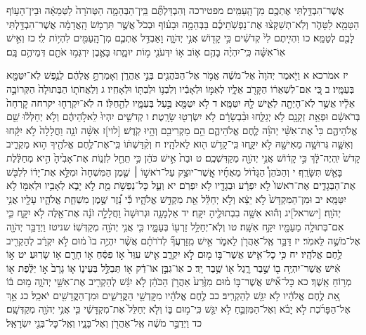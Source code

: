 \documentclass[twoside, openany, parskip=half, 11pt]{book}
\begin{document}
אֲשֶׁר־הִבְדַּ֥לְתִּי אֶתְכֶ֖ם מִן־הָֽעַמִּֽים׃ מפטירכה וְהִבְדַּלְתֶּ֞ם בֵּֽין־הַבְּהֵמָ֤ה הַטְּהֹרָה֙ לַטְּמֵאָ֔ה וּבֵין־הָע֥וֹף הַטָּמֵ֖א לַטָּהֹ֑ר וְלֹֽא־תְשַׁקְּצ֨וּ אֶת־נַפְשֹֽׁתֵיכֶ֜ם בַּבְּהֵמָ֣ה וּבָע֗וֹף וּבְכֹל֙ אֲשֶׁ֣ר תִּרְמֹ֣שׂ הָֽאֲדָמָ֔ה אֲשֶׁר־הִבְדַּ֥לְתִּי לָכֶ֖ם לְטַמֵּֽא׃ כו וִהְיִ֤יתֶם לִי֙ קְדֹשִׁ֔ים כִּ֥י קָד֖וֹשׁ אֲנִ֣י יְהֹוָ֑ה וָאַבְדִּ֥ל אֶתְכֶ֛ם מִן־הָֽעַמִּ֖ים לִהְי֥וֹת לִֽי׃ כז וְאִ֣ישׁ אֽוֹ־אִשָּׁ֗ה כִּֽי־יִהְיֶ֨ה בָהֶ֥ם א֛וֹב א֥וֹ יִדְּעֹנִ֖י מ֣וֹת יוּמָ֑תוּ בָּאֶ֛בֶן יִרְגְּמ֥וּ אֹתָ֖ם דְּמֵיהֶ֥ם בָּֽם׃

יז אמֹרכא א וַיֹּ֤אמֶר יְהֹוָה֙ אֶל־מֹשֶׁ֔ה אֱמֹ֥ר אֶל־הַכֹּהֲנִ֖ים בְּנֵ֣י אַהֲרֹ֑ן וְאָמַרְתָּ֣ אֲלֵהֶ֔ם לְנֶ֥פֶשׁ לֹֽא־יִטַּמָּ֖א בְּעַמָּֽיו׃ ב כִּ֚י אִם־לִשְׁאֵר֔וֹ הַקָּרֹ֖ב אֵלָ֑יו לְאִמּ֣וֹ וּלְאָבִ֔יו וְלִבְנ֥וֹ וּלְבִתּ֖וֹ וּלְאָחִֽיו׃ ג וְלַאֲחֹת֤וֹ הַבְּתוּלָה֙ הַקְּרוֹבָ֣ה אֵלָ֔יו אֲשֶׁ֥ר לֹֽא־הָיְתָ֖ה לְאִ֑ישׁ לָ֖הּ יִטַּמָּֽא׃ ד לֹ֥א יִטַּמָּ֖א בַּ֣עַל בְּעַמָּ֑יו לְהֵ֖חַלּֽוֹ׃ ה לֹֽא־יִקְרְח֤וּ יקרחה קׇרְחָה֙ בְּרֹאשָׁ֔ם וּפְאַ֥ת זְקָנָ֖ם לֹ֣א יְגַלֵּ֑חוּ וּבִ֨בְשָׂרָ֔ם לֹ֥א יִשְׂרְט֖וּ שָׂרָֽטֶת׃ ו קְדֹשִׁ֤ים יִהְיוּ֙ לֵאלֹ֣הֵיהֶ֔ם וְלֹ֣א יְחַלְּל֔וּ שֵׁ֖ם אֱלֹהֵיהֶ֑ם כִּי֩ אֶת־אִשֵּׁ֨י יְהֹוָ֜ה לֶ֧חֶם אֱלֹהֵיהֶ֛ם הֵ֥ם מַקְרִיבִ֖ם וְהָ֥יוּ קֹֽדֶשׁ׃ [לוי]ז אִשָּׁ֨ה זֹנָ֤ה וַחֲלָלָה֙ לֹ֣א יִקָּ֔חוּ וְאִשָּׁ֛ה גְּרוּשָׁ֥ה מֵאִישָׁ֖הּ לֹ֣א יִקָּ֑חוּ כִּֽי־קָדֹ֥שׁ ה֖וּא לֵאלֹהָֽיו׃ ח וְקִ֨דַּשְׁתּ֔וֹ כִּֽי־אֶת־לֶ֥חֶם אֱלֹהֶ֖יךָ ה֣וּא מַקְרִ֑יב קָדֹשׁ֙ יִֽהְיֶה־לָּ֔ךְ כִּ֣י קָד֔וֹשׁ אֲנִ֥י יְהֹוָ֖ה מְקַדִּשְׁכֶֽם׃ ט וּבַת֙ אִ֣ישׁ כֹּהֵ֔ן כִּ֥י תֵחֵ֖ל לִזְנ֑וֹת אֶת־אָבִ֙יהָ֙ הִ֣יא מְחַלֶּ֔לֶת בָּאֵ֖שׁ תִּשָּׂרֵֽף׃
י וְהַכֹּהֵן֩ הַגָּד֨וֹל מֵאֶחָ֜יו אֲֽשֶׁר־יוּצַ֥ק עַל־רֹאשׁ֣וֹ ׀ שֶׁ֤מֶן הַמִּשְׁחָה֙ וּמִלֵּ֣א אֶת־יָד֔וֹ לִלְבֹּ֖שׁ אֶת־הַבְּגָדִ֑ים אֶת־רֹאשׁוֹ֙ לֹ֣א יִפְרָ֔ע וּבְגָדָ֖יו לֹ֥א יִפְרֹֽם׃ יא וְעַ֛ל כׇּל־נַפְשֹׁ֥ת מֵ֖ת לֹ֣א יָבֹ֑א לְאָבִ֥יו וּלְאִמּ֖וֹ לֹ֥א יִטַּמָּֽא׃ יב וּמִן־הַמִּקְדָּשׁ֙ לֹ֣א יֵצֵ֔א וְלֹ֣א יְחַלֵּ֔ל אֵ֖ת מִקְדַּ֣שׁ אֱלֹהָ֑יו כִּ֡י נֵ֠זֶר שֶׁ֣מֶן מִשְׁחַ֧ת אֱלֹהָ֛יו עָלָ֖יו אֲנִ֥י יְהֹוָֽה׃ [ישראל]יג וְה֕וּא אִשָּׁ֥ה בִבְתוּלֶ֖יהָ יִקָּֽח׃ יד אַלְמָנָ֤ה וּגְרוּשָׁה֙ וַחֲלָלָ֣ה זֹנָ֔ה אֶת־אֵ֖לֶּה לֹ֣א יִקָּ֑ח כִּ֛י אִם־בְּתוּלָ֥ה מֵעַמָּ֖יו יִקַּ֥ח אִשָּֽׁה׃ טו וְלֹֽא־יְחַלֵּ֥ל זַרְע֖וֹ בְּעַמָּ֑יו כִּ֛י אֲנִ֥י יְהֹוָ֖ה מְקַדְּשֽׁוֹ׃
שניטז וַיְדַבֵּ֥ר יְהֹוָ֖ה אֶל־מֹשֶׁ֥ה לֵּאמֹֽר׃ יז דַּבֵּ֥ר אֶֽל־אַהֲרֹ֖ן לֵאמֹ֑ר אִ֣ישׁ מִֽזַּרְעֲךָ֞ לְדֹרֹתָ֗ם אֲשֶׁ֨ר יִהְיֶ֥ה בוֹ֙ מ֔וּם לֹ֣א יִקְרַ֔ב לְהַקְרִ֖יב לֶ֥חֶם אֱלֹהָֽיו׃ יח כִּ֥י כׇל־אִ֛ישׁ אֲשֶׁר־בּ֥וֹ מ֖וּם לֹ֣א יִקְרָ֑ב אִ֤ישׁ עִוֵּר֙ א֣וֹ פִסֵּ֔חַ א֥וֹ חָרֻ֖ם א֥וֹ שָׂרֽוּעַ׃ יט א֣וֹ אִ֔ישׁ אֲשֶׁר־יִהְיֶ֥ה ב֖וֹ שֶׁ֣בֶר רָ֑גֶל א֖וֹ שֶׁ֥בֶר יָֽד׃ כ אֽוֹ־גִבֵּ֣ן אוֹ־דַ֔ק א֖וֹ תְּבַלֻּ֣ל בְּעֵינ֑וֹ א֤וֹ גָרָב֙ א֣וֹ יַלֶּ֔פֶת א֖וֹ מְר֥וֹחַ אָֽשֶׁךְ׃ כא כׇּל־אִ֞ישׁ אֲשֶׁר־בּ֣וֹ מ֗וּם מִזֶּ֙רַע֙ אַהֲרֹ֣ן הַכֹּהֵ֔ן לֹ֣א יִגַּ֔שׁ לְהַקְרִ֖יב אֶת־אִשֵּׁ֣י יְהֹוָ֑ה מ֣וּם בּ֔וֹ אֵ֚ת לֶ֣חֶם אֱלֹהָ֔יו לֹ֥א יִגַּ֖שׁ לְהַקְרִֽיב׃ כב לֶ֣חֶם אֱלֹהָ֔יו מִקׇּדְשֵׁ֖י הַקֳּדָשִׁ֑ים וּמִן־הַקֳּדָשִׁ֖ים יֹאכֵֽל׃ כג אַ֣ךְ אֶל־הַפָּרֹ֜כֶת לֹ֣א יָבֹ֗א וְאֶל־הַמִּזְבֵּ֛חַ לֹ֥א יִגַּ֖שׁ כִּֽי־מ֣וּם בּ֑וֹ וְלֹ֤א יְחַלֵּל֙ אֶת־מִקְדָּשַׁ֔י כִּ֛י אֲנִ֥י יְהֹוָ֖ה מְקַדְּשָֽׁם׃ כד וַיְדַבֵּ֣ר מֹשֶׁ֔ה אֶֽל־אַהֲרֹ֖ן וְאֶל־בָּנָ֑יו וְאֶֽל־כׇּל־בְּנֵ֖י יִשְׂרָאֵֽל׃
\end{document}
